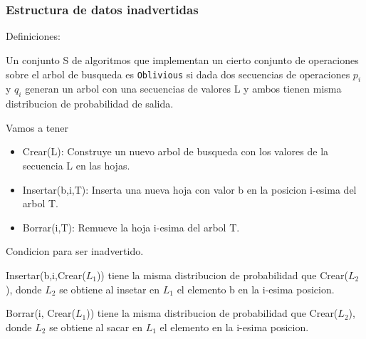\documentclass[10pt,handout]{beamer}
\begin{document}

\section{}
\begin{frame}
\frametitle{Estructura de datos inadvertidas}

Definiciones:

Un conjunto S de algoritmos que implementan un cierto conjunto de operaciones sobre el arbol de busqueda es
\texttt{Oblivious} si dada dos secuencias de operaciones $p_i$ y $q_i$ generan un arbol con una secuencias
de valores L y ambos tienen misma distribucion de probabilidad de salida.


Vamos a tener
\begin{itemize}
  \item Crear(L): Construye un nuevo arbol de busqueda con los valores de la secuencia L en las hojas.
  \item Insertar(b,i,T): Inserta una nueva hoja con valor b en la posicion i-esima del arbol T.
  \item Borrar(i,T): Remueve la hoja i-esima del arbol T.
\end{itemize}

Condicion para ser inadvertido.

Insertar(b,i,Crear($L_1$)) tiene la misma distribucion de probabilidad que Crear($L_2$), donde $L_{2}$
se obtiene al insetar en $L_{1}$ el elemento b en la i-esima posicion.

Borrar(i, Crear($L_{1}$)) tiene la misma distribucion de probabilidad que Crear($L_2$), donde $L_{2}$
se obtiene al sacar en $L_{1}$ el elemento en la i-esima posicion.


\end{frame}

\end{document}

